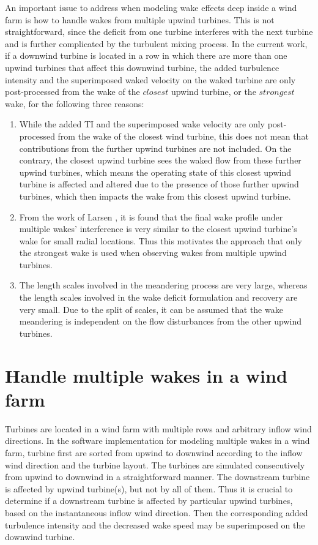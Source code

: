 \documentclass{umthesis}
\begin{document}
An important issue to address when modeling wake effects deep inside a wind farm is how to handle wakes from multiple upwind
turbines. This is not straightforward, since the deficit from one turbine interferes with the next turbine and is further
complicated by the turbulent mixing process. In the current work, if a downwind turbine is located in a row in which there are more than one upwind turbines that affect this downwind turbine, the added turbulence intensity and the superimposed waked velocity on the waked turbine are only post-processed from the wake of the $closest$ upwind turbine, or the $strongest$ wake, for the following three reasons:
\begin{enumerate}
  \item While the added TI and the superimposed wake velocity are only post-processed from the wake of the closest wind turbine, this does not mean that contributions from the further upwind turbines are not included. On the contrary, the closest upwind turbine sees the waked flow from these further upwind turbines, which means the operating state of this closest upwind turbine is affected and altered due to the presence of those further upwind turbines, which then impacts the wake from this closest upwind turbine.
  \item From the work of Larsen \cite{larsen_validation_2013}, it is found that the final wake profile under multiple wakes' interference is very similar to the closest upwind turbine's wake for small radial locations. Thus this motivates the approach that only the strongest wake is used when observing wakes from multiple upwind turbines.
  \item The length scales involved in the meandering process are very large, whereas the length scales involved in the wake deficit formulation and recovery are very small. Due to the split of scales, it can be assumed that the wake meandering is independent on the flow disturbances from the other upwind turbines.
\end{enumerate}

\section{Handle multiple wakes in a wind farm}\label{sec:DWM_windfarm}
Turbines are located in a wind farm with multiple rows and arbitrary inflow wind directions. In the software implementation for modeling multiple wakes in a wind farm, turbine first are sorted from upwind to downwind according to the inflow wind direction and the turbine layout. The turbines are simulated consecutively from upwind to downwind in a straightforward manner. The downstream turbine is affected by upwind turbine(s), but not by all of them. Thus it is crucial to determine if a downstream turbine is affected by particular upwind turbines, based on the instantaneous inflow wind direction. Then the corresponding added turbulence intensity and the decreased wake speed may be superimposed on the downwind turbine.
\end{document}
